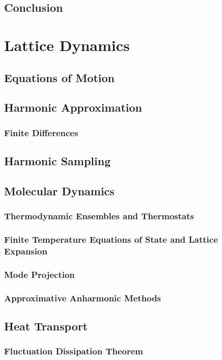 \documentclass[a4paper,12pt]{book}
\begin{document}
\subsection{Conclusion}

\section{Lattice Dynamics}
\subsection{Equations of Motion}
\subsection{Harmonic Approximation}
\subsubsection{Finite Differences}
\subsection{Harmonic Sampling}

\subsection{Molecular Dynamics}
\subsubsection{Thermodynamic Ensembles and Thermostats}
\subsubsection{Finite Temperature Equations of State and Lattice Expansion}
\subsubsection{Mode Projection}
\subsubsection{Approximative Anharmonic Methods}

\subsection{Heat Transport}
\subsubsection{Fluctuation Dissipation Theorem}
\end{document}

